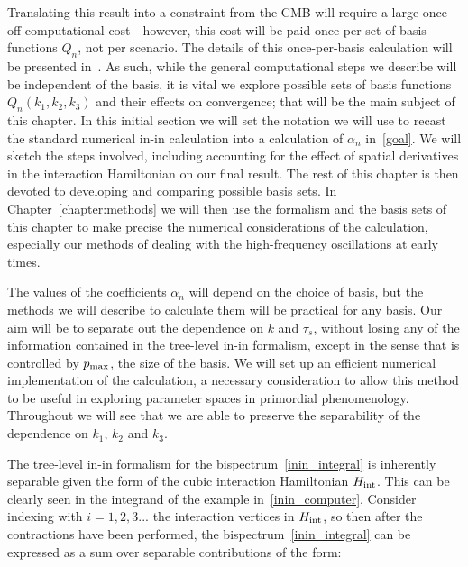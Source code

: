 Translating this result into a constraint from the CMB
will require a large once-off computational cost---however, this cost will be
paid once per set of basis functions $Q_n$, not per scenario.
The details of this once-per-basis calculation will be
presented in~\cite{Sohn_2021}.
As such, while the general computational steps we
describe will be independent of the basis, it is vital we
explore possible sets of basis functions $Q_n(k_1,k_2,k_3)$
and their effects on convergence;
that will be the main subject of this chapter.
In this initial section we will set the notation we will use to recast
the standard numerical in-in calculation into a calculation of $\alpha_n$ in~\eqref{goal}.
We will sketch the steps involved, including accounting for the effect of spatial derivatives
in the interaction Hamiltonian on our final result.
The rest of this chapter is then devoted to developing and comparing possible basis sets.
In Chapter~\ref{chapter:methods} we will then use the formalism and the basis sets of this chapter to
make precise the numerical considerations of the calculation,
especially our methods of dealing with the high-frequency
oscillations at early times.


The values of the coefficients $\alpha_n$ will depend on the choice
of basis, but the methods we will describe to calculate them
will be practical for any basis.
Our aim will be to separate out the dependence on $k$ and $\tau_s$,
without losing any of the information contained in the tree-level in-in formalism,
except in the sense that is controlled by $p_\text{max}$, the size of the basis.
We will set up an efficient numerical implementation of the calculation,
a necessary consideration to allow this method to be useful in exploring
parameter spaces in primordial phenomenology.
Throughout we will see that we are able to preserve the
separability of the dependence on $k_1$, $k_2$ and $k_3$.


The tree-level in-in formalism for the bispectrum~\eqref{inin_integral} is inherently separable given
the form of the cubic interaction Hamiltonian $H_{\rm int}$.
This can be clearly seen in the integrand of the example in~\eqref{inin_computer}.
Consider indexing with ${i=1,2,3...}$ the interaction vertices in $H_{\rm int}$,
so then after the contractions have been performed,
the bispectrum~\eqref{inin_integral} can be expressed as a sum over separable contributions of the form:


